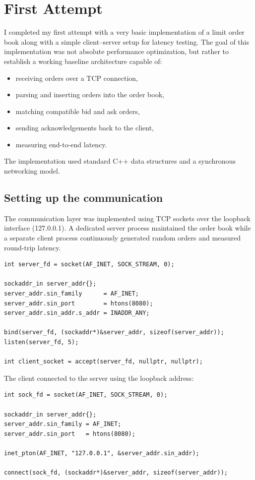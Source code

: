 \documentclass[11pt,a4paper]{article}
\begin{document}
\section{First Attempt}\label{sec:first}

I completed my first attempt with a very basic implementation of a limit
order book along with a simple client--server setup for latency testing.
The goal of this implementation was not absolute performance optimization,
but rather to establish a working baseline architecture capable of:
\begin{itemize}
  \item receiving orders over a TCP connection,
  \item parsing and inserting orders into the order book,
  \item matching compatible bid and ask orders,
  \item sending acknowledgements back to the client,
  \item measuring end-to-end latency.
\end{itemize}
The implementation used standard C++ data structures and a synchronous
networking model.

\subsection{Setting up the communication}

The communication layer was implemented using TCP sockets over the loopback
interface (127.0.0.1). A dedicated server process maintained the order book
while a separate client process continuously generated random orders and
measured round-trip latency.

\begin{lstlisting}[caption={Server socket setup}]
int server_fd = socket(AF_INET, SOCK_STREAM, 0);

sockaddr_in server_addr{};
server_addr.sin_family      = AF_INET;
server_addr.sin_port        = htons(8080);
server_addr.sin_addr.s_addr = INADDR_ANY;

bind(server_fd, (sockaddr*)&server_addr, sizeof(server_addr));
listen(server_fd, 5);

int client_socket = accept(server_fd, nullptr, nullptr);
\end{lstlisting}

The client connected to the server using the loopback address:

\begin{lstlisting}[caption={Client connection setup}]
int sock_fd = socket(AF_INET, SOCK_STREAM, 0);

sockaddr_in server_addr{};
server_addr.sin_family = AF_INET;
server_addr.sin_port   = htons(8080);

inet_pton(AF_INET, "127.0.0.1", &server_addr.sin_addr);

connect(sock_fd, (sockaddr*)&server_addr, sizeof(server_addr));
\end{lstlisting}
\end{document}
